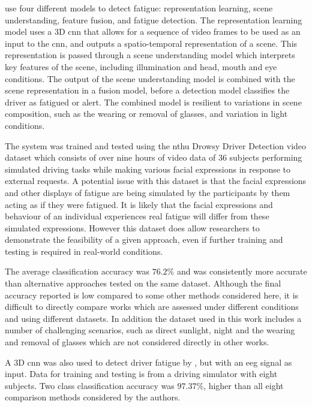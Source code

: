 \documentclass[11pt, parskip=half*,twoside=false]{scrbook}
\begin{document}
\citet{yuDriverDrowsinessDetection2019} use four different models to detect fatigue: representation learning, scene understanding, feature fusion, and fatigue detection. The representation learning model uses a 3D \gls{cnn} that allows for a sequence of video frames to be used as an input to the \gls{cnn}, and outputs a spatio-temporal representation of a scene. This representation is passed through a scene understanding model which interprets key features of the scene, including illumination and head, mouth and eye conditions. The output of the scene understanding model is combined with the scene representation in a fusion model, before a detection model classifies the driver as fatigued or alert. The combined model is resilient to variations in scene composition, such as the wearing or removal of glasses, and variation in light conditions. 
 
The system was trained and tested using the \gls{nthu} Drowsy Driver Detection video dataset \citep{wengDriverDrowsinessDetection2017} which consists of over nine hours of video data of 36 subjects performing simulated driving tasks while making various facial expressions in response to external requests. A potential issue with this dataset is that the facial expressions and other displays of fatigue are being simulated by the participants by them acting as if they were fatigued. It is likely that the facial expressions and behaviour of an individual experiences real fatigue will differ from these simulated expressions. However this dataset does allow researchers to demonstrate the feasibility of a given approach, even if further training and testing is required in real-world conditions.

The average classification accuracy was $76.2\%$ and was consistently more accurate than alternative approaches tested on the same dataset. Although the final accuracy reported is low compared to some other methods considered here, it is difficult to directly compare works which are assessed under different conditions and using different datasets. In addition the dataset used in this work includes a number of challenging scenarios, such as direct sunlight, night and the wearing and removal of glasses which are not considered directly in other works.

A 3D \gls{cnn} was also used to detect driver fatigue by \citet{gaoEEGBasedSpatioTemporal2019}, but with an  \gls{eeg} signal as input. Data for training and testing is from a driving simulator with eight subjects. Two class classification accuracy was $97.37\%$, higher than all eight comparison methods considered by the authors.
\end{document}
